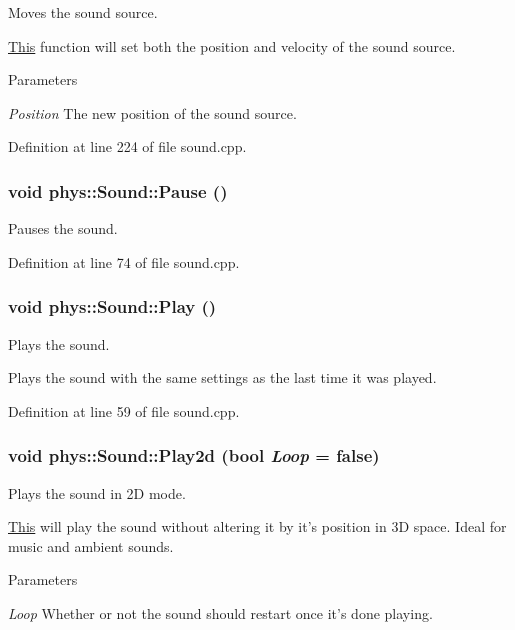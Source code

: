 Moves the sound source. 

\hyperlink{structThis}{This} function will set both the position and velocity of the sound source. 
\begin{DoxyParams}{Parameters}
\item[{\em Position}]The new position of the sound source. \end{DoxyParams}


Definition at line 224 of file sound.cpp.

\hypertarget{classphys_1_1Sound_a805bef416bec70b5e250dd29e622cf46}{
\subsubsection[{Pause}]{\setlength{\rightskip}{0pt plus 5cm}void phys::Sound::Pause ()}}
\label{dc/d2f/classphys_1_1Sound_a805bef416bec70b5e250dd29e622cf46}
Pauses the sound. 

Definition at line 74 of file sound.cpp.

\hypertarget{classphys_1_1Sound_ae7caa90deb9e5a4cab2d5ada27f5e5b5}{
\subsubsection[{Play}]{\setlength{\rightskip}{0pt plus 5cm}void phys::Sound::Play ()}}
\label{dc/d2f/classphys_1_1Sound_ae7caa90deb9e5a4cab2d5ada27f5e5b5}


Plays the sound. 

Plays the sound with the same settings as the last time it was played. 

Definition at line 59 of file sound.cpp.

\hypertarget{classphys_1_1Sound_a853bb9a2c1b41cd82a385608614861e7}{
\subsubsection[{Play2d}]{\setlength{\rightskip}{0pt plus 5cm}void phys::Sound::Play2d (bool {\em Loop} = {\ttfamily false})}}
\label{dc/d2f/classphys_1_1Sound_a853bb9a2c1b41cd82a385608614861e7}


Plays the sound in 2D mode. 

\hyperlink{structThis}{This} will play the sound without altering it by it's position in 3D space. Ideal for music and ambient sounds. 
\begin{DoxyParams}{Parameters}
\item[{\em Loop}]Whether or not the sound should restart once it's done playing. \end{DoxyParams}


